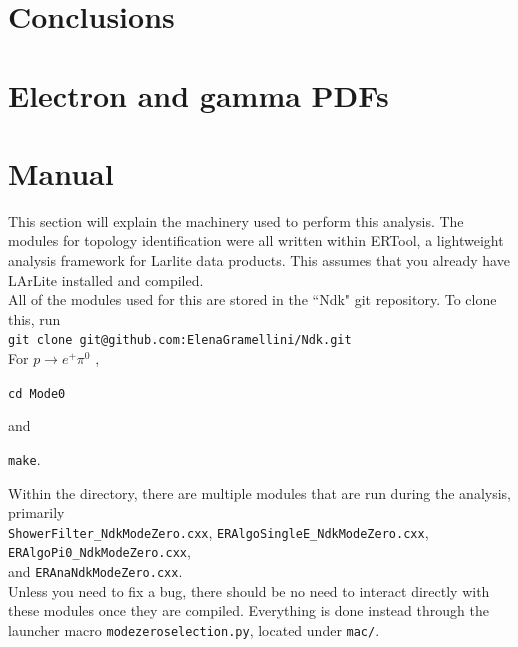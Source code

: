 \documentclass[a4paper, 10pt]{article}
\begin{document}

\section{Conclusions}


\nocite{*}




\appendix
\section{Electron and gamma PDFs}
\label{PDFgamma}

\section{Manual}

This section will explain the machinery used to perform this analysis. The modules for topology identification were all written within ERTool, a lightweight analysis framework for Larlite data products. This assumes that you already have LArLite installed and compiled.\\

All of the modules used for this are stored in the ``Ndk" git repository. To clone this, run\\

\texttt{git clone git@github.com:ElenaGramellini/Ndk.git} \\

\noindent
For $p \rightarrow e^{+} \pi^{0}$ , 

\texttt{cd Mode0}

\noindent
and

\texttt{make}.

Within the directory, there are multiple modules that are run during the analysis, primarily\\
 \texttt{ShowerFilter\_NdkModeZero.cxx}, \texttt{ERAlgoSingleE\_NdkModeZero.cxx}, \texttt{ERAlgoPi0\_NdkModeZero.cxx}, \\ and \texttt{ERAnaNdkModeZero.cxx}. \\
Unless you need to fix a bug, there should be no need to interact directly with these modules once they are compiled. Everything is done instead through the launcher macro \texttt{modezeroselection.py}, located under \texttt{mac/}.
\end{document}
